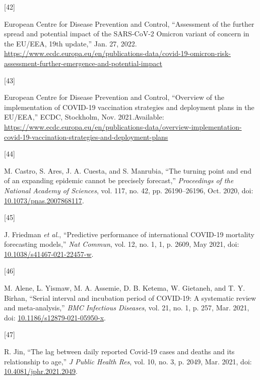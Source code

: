 \documentclass[
]{article}
\newlength{\cslhangindent}
\newlength{\csllabelwidth}
\newlength{\cslentryspacingunit} %
\newenvironment{CSLReferences}[2] %
 {%
  \setlength{\parindent}{0pt}
  \ifodd #1
  \let\oldpar\par
  \def\par{\hangindent=\cslhangindent\oldpar}
  \fi
  \setlength{\parskip}{#2\cslentryspacingunit}
 }%
 {}
\newcommand{\CSLLeftMargin}[1]{\parbox[t]{\csllabelwidth}{#1}}
\newcommand{\CSLRightInline}[1]{\parbox[t]{\linewidth - \csllabelwidth}{#1}\break}
\begin{document}
\begin{CSLReferences}{0}{0}
\leavevmode{}%
\CSLLeftMargin{{[}42{]} }
\CSLRightInline{European Centre for Disease Prevention and Control, {``Assessment of the further spread and potential impact of the {SARS-CoV-2 Omicron} variant of concern in the {EU}/{EEA}, 19th update,''} Jan. 27, 2022. \url{https://www.ecdc.europa.eu/en/publications-data/covid-19-omicron-risk-assessment-further-emergence-and-potential-impact}}

\leavevmode{}%
\CSLLeftMargin{{[}43{]} }
\CSLRightInline{European Centre for Disease Prevention and Control, {``Overview of the implementation of {COVID-19} vaccination strategies and deployment plans in the {EU}/{EEA},''} {ECDC}, {Stockholm}, Nov. 2021.Available: \url{https://www.ecdc.europa.eu/en/publications-data/overview-implementation-covid-19-vaccination-strategies-and-deployment-plans}}

\leavevmode{}%
\CSLLeftMargin{{[}44{]} }
\CSLRightInline{M. Castro, S. Ares, J. A. Cuesta, and S. Manrubia, {``The turning point and end of an expanding epidemic cannot be precisely forecast,''} \emph{Proceedings of the National Academy of Sciences}, vol. 117, no. 42, pp. 26190--26196, Oct. 2020, doi: \href{https://doi.org/10.1073/pnas.2007868117}{10.1073/pnas.2007868117}.}

\leavevmode{}%
\CSLLeftMargin{{[}45{]} }
\CSLRightInline{J. Friedman \emph{et al.}, {``Predictive performance of international {COVID-19} mortality forecasting models,''} \emph{Nat Commun}, vol. 12, no. 1, 1, p. 2609, May 2021, doi: \href{https://doi.org/10.1038/s41467-021-22457-w}{10.1038/s41467-021-22457-w}.}

\leavevmode{}%
\CSLLeftMargin{{[}46{]} }
\CSLRightInline{M. Alene, L. Yismaw, M. A. Assemie, D. B. Ketema, W. Gietaneh, and T. Y. Birhan, {``Serial interval and incubation period of {COVID-19}: A systematic review and meta-analysis,''} \emph{BMC Infectious Diseases}, vol. 21, no. 1, p. 257, Mar. 2021, doi: \href{https://doi.org/10.1186/s12879-021-05950-x}{10.1186/s12879-021-05950-x}.}

\leavevmode{}%
\CSLLeftMargin{{[}47{]} }
\CSLRightInline{R. Jin, {``The lag between daily reported {Covid-19} cases and deaths and its relationship to age,''} \emph{J Public Health Res}, vol. 10, no. 3, p. 2049, Mar. 2021, doi: \href{https://doi.org/10.4081/jphr.2021.2049}{10.4081/jphr.2021.2049}.}


\end{CSLReferences}
\end{document}
